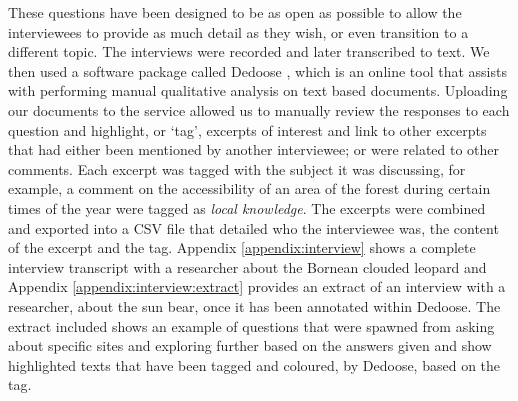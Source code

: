 			These questions have been designed to be as open as possible to allow the interviewees to provide as much detail as they wish, or even transition to a different topic. The interviews were recorded and later transcribed to text. We then used a software package called Dedoose \cite{dedoose2012web}, which is an online tool that assists with performing manual qualitative analysis on text based documents. Uploading our documents to the service allowed us to manually review the responses to each question and highlight, or `tag', excerpts of interest and link to other excerpts that had either been mentioned by another interviewee; or were related to other comments. Each excerpt was tagged with the subject it was discussing, for example, a comment on the accessibility of an area of the forest during certain times of the year were tagged as \textit{local knowledge}. The excerpts were combined and exported into a CSV file that detailed who the interviewee was, the content of the excerpt and the tag. Appendix \ref{appendix:interview} shows a complete interview transcript with a researcher about the Bornean clouded leopard and Appendix \ref{appendix:interview:extract} provides an extract of an interview with a researcher, about the sun bear, once it has been annotated within Dedoose. The extract included shows an example of questions that were spawned from asking about specific sites and exploring further based on the answers given and show highlighted texts that have been tagged and coloured, by Dedoose, based on the tag.
			
